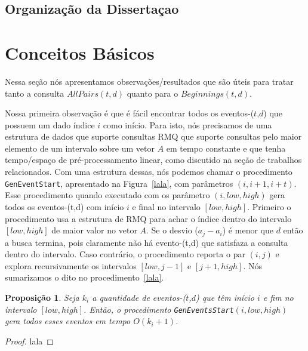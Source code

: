 \documentclass[12pt]{article}
\newtheorem{prop}[thm]{Proposição}
\begin{document}
\subsection{Organização da Dissertaçao}
 
\section{Conceitos Básicos}

Nessa seção nós apresentamos observações/resultados que são úteis para tratar
tanto a consulta $AllPairs(t, d)$ quanto para o $Beginnings(t, d)$.

Nossa primeira observação é que é fácil encontrar todos os eventos-($t$,$d$) que possuem
um dado índice $i$ como início. Para isto, nós precisamos de uma estrutura de dados que
suporte consultas RMQ que suporte consultas pelo maior elemento de um intervalo sobre
um vetor $A$ em tempo constante e que tenha tempo/espaço de pré-processamento linear,
como discutido na seção de trabalhos relacionados. Com uma estrutura dessas, nós podemos
chamar o procedimento \verb|GenEventStart|, apresentado na Figura~\ref{lala}, com parâmetros
$(i, i + 1, i + t)$. Esse procedimento quando executado com os parâmetro $(i, low, high)$ gera
todos os eventos-(t,d) com início $i$ e final no intervalo $[low, high]$. Primeiro o procedimento
usa a estrutura de RMQ para achar o índice dentro do intervalo $[low, high]$ de maior valor no 
vetor $A$. Se o desvio ($a_j - a_i$) é menor que $d$ então a busca termina, pois claramente não
há evento-(t,d) que satisfaza a consulta dentro do intervalo. Caso contrário, o procedimento reporta
o par $(i, j)$ e explora recursivamente os intervalos $[low, j - 1]$ e $[j + 1, high]$. Nós sumarizamos
o dito no procedimento~\ref{lala}.

\begin{prop}
Seja $k_i$ a quantidade de eventos-($t$,$d$) que têm início $i$ e fim no intervalo $[low, high]$.
Então, o procedimento \verb|GenEventsStart|$(i, low, high)$ gera todos esses eventos em tempo $O(k_i + 1)$.
\end{prop}
\begin{proof}
lala
\end{proof}
\end{document}
